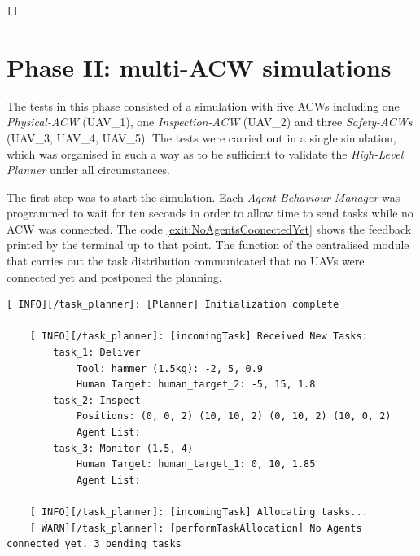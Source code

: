 \begin{lstlisting}[caption={Feedback messages printed after mission over signal}, breaklines=true, label=exit:event_MissionOver]
	[]
\end{lstlisting}

\section{Phase II: multi-ACW simulations}
\label{sec:phaseII}
The tests in this phase consisted of a simulation with five \glspl{ACW} including one \emph{Physical-ACW} (UAV\_1), one \emph{Inspection-ACW} (UAV\_2) and three \emph{Safety-ACWs} (UAV\_3, UAV\_4, UAV\_5). The tests were carried out in a single simulation, which was organised in such a way as to be sufficient to validate the \emph{High-Level Planner} under all circumstances.

The first step was to start the simulation. Each \emph{Agent Behaviour Manager} was programmed to wait for ten seconds in order to allow time to send tasks while no \gls{ACW} was connected. The code \ref{exit:NoAgentsCoonectedYet} shows the feedback printed by the terminal up to that point. The function of the centralised module that carries out the task distribution communicated that no \glspl{UAV} were connected yet and postponed the planning.

\begin{lstlisting}[caption={Feedback messages printed after the start of the simulation before the ACWs were connected}, breaklines=true, label=exit:NoAgentsCoonectedYet]
    [ INFO][/task_planner]: [Planner] Initialization complete

    [ INFO][/task_planner]: [incomingTask] Received New Tasks:
	    task_1: Deliver
		    Tool: hammer (1.5kg): -2, 5, 0.9
		    Human Target: human_target_2: -5, 15, 1.8
	    task_2: Inspect
		    Positions: (0, 0, 2) (10, 10, 2) (0, 10, 2) (10, 0, 2)
		    Agent List:
	    task_3: Monitor (1.5, 4)
		    Human Target: human_target_1: 0, 10, 1.85
		    Agent List:

    [ INFO][/task_planner]: [incomingTask] Allocating tasks...
    [ WARN][/task_planner]: [performTaskAllocation] No Agents connected yet. 3 pending tasks
\end{lstlisting}

